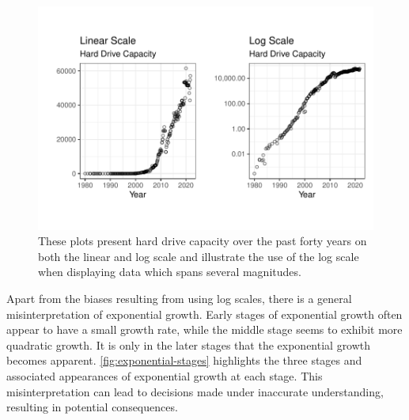 \documentclass[12pt]{article}
\begin{document}
\begin{figure}[tbp]

{\centering \includegraphics[width=1\linewidth,]{logarithmic-lineups_files/figure-latex/log-scales-1} 

}

\caption[Linear scale versus log scale]{These plots present hard drive capacity over the past forty years on both the linear and log scale and illustrate the use of the log scale when displaying data which spans several magnitudes.}\label{fig:log-scales}
\end{figure}

Apart from the biases resulting from using log scales, there is a
general misinterpretation of exponential growth. Early stages of
exponential growth often appear to have a small growth rate, while the
middle stage seems to exhibit more quadratic growth. It is only in the
later stages that the exponential growth becomes apparent.
\cref{fig:exponential-stages} highlights the three stages and associated
appearances of exponential growth at each stage. This misinterpretation
can lead to decisions made under inaccurate understanding, resulting in
potential consequences.
\end{document}
